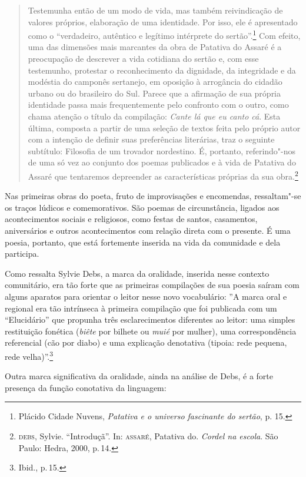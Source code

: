 \documentclass[11pt]{extarticle}
\begin{document}
\begin{quote}
Testemunha então de um modo de vida, mas também reivindicação de valores
próprios, elaboração de uma identidade. Por isso, ele é apresentado como o
“verdadeiro, autêntico e legítimo intérprete do sertão”.\footnote{ Plácido Cidade
Nuvens, \textit{Patativa e o universo fascinante do sertão}, p. 15.} Com
efeito, uma das dimensões mais marcantes da obra de Patativa do Assaré é a
preocupação de descrever a vida cotidiana do sertão e, com esse testemunho,
protestar o reconhecimento da dignidade, da integridade e da modéstia do
camponês sertanejo, em oposição à arrogância do cidadão urbano ou do brasileiro
do Sul. Parece que a afirmação de sua própria identidade passa mais
frequentemente pelo confronto com o outro, como chama atenção o título da
compilação: \textit{Cante lá que eu canto cá}. Esta última, composta a partir de uma
seleção de textos feita pelo próprio autor com a intenção de definir suas
preferências literárias, traz o seguinte subtítulo: Filosofia de um trovador
nordestino. É, portanto, referindo"-nos de uma só vez ao conjunto dos poemas
publicados e à vida de Patativa do Assaré que tentaremos depreender as
características próprias da sua obra.\footnote{\textsc{debs}, Sylvie. ``Introduçã''. In: \textsc{assaré}, Patativa do. \textit{Cordel na escola}. São Paulo: Hedra, 2000, p.\,14.}
\end{quote}

Nas primeiras obras do poeta, fruto de improvisações e encomendas, ressaltam"-se os traços lúdicos e comemorativos. São poemas de circunstância, ligados aos acontecimentos sociais e religiosos, como festas de santos, casamentos, aniversários e outros acontecimentos com relação direta com o presente.
É uma poesia, portanto, que está fortemente inserida na vida da comunidade e dela participa.

Como ressalta Sylvie Debs, a marca da oralidade, inserida nesse contexto comunitário, era tão forte que as primeiras compilações de sua poesia saíram com alguns aparatos para orientar o leitor nesse novo vocabulário: ''A marca oral e regional era tão intrínseca à primeira compilação que foi
publicada com um “Elucidário” que propunha três esclarecimentos diferentes ao
leitor: uma simples restituição fonética (\textit{biête} por bilhete ou \textit{muié} por mulher), uma correspondência referencial (cão por diabo) e uma explicação denotativa (tipoia: rede pequena, rede velha)''.\footnote{Ibid., p.\,15.}

Outra marca significativa da oralidade, ainda na análise de Debs, é a forte presença da função conotativa da linguagem:
\end{document}
